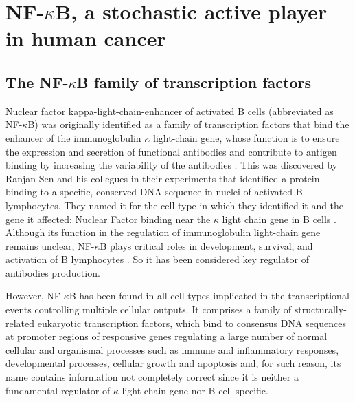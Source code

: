 \documentclass[12pt,a4paper]{report}
\begin{document}
\part{NF-\texorpdfstring{$\kappa$}{}B, a stochastic active player in human cancer}
\chapter{The NF-\texorpdfstring{$\kappa$}{}B family of transcription factors}



Nuclear factor kappa-light-chain-enhancer of activated B cells (abbreviated as NF-$\kappa$B) was originally identified as a family of transcription factors that bind the enhancer of the immunoglobulin $\kappa$ light-chain gene, whose function is to ensure the expression and secretion of functional antibodies and contribute to antigen binding by increasing the variability of the antibodies \cite{immunoglobulin}. This was discovered by Ranjan Sen and his collegues in their experiments that identified a protein binding to a specific, conserved DNA sequence in nuclei of activated B lymphocytes. They named it for the cell type in which they identified it and the gene it affected: Nuclear Factor binding near the $\kappa$ light chain gene in B cells \cite{nfkb30years}. Although its function in the regulation of immunoglobulin light-chain gene remains unclear, NF-$\kappa$B plays critical roles in development, survival, and activation of B lymphocytes \cite{Immuno}. So it has been considered key regulator of antibodies production. 

However, NF-$\kappa$B has been found in all cell types implicated in the transcriptional events controlling multiple cellular outputs. It comprises a family of structurally-related eukaryotic transcription factors, which bind to consensus DNA sequences at promoter regions of responsive genes regulating a large number of normal cellular and organismal processes such as immune and inflammatory responses, developmental processes, cellular growth and apoptosis and, for such reason, its name contains information not completely correct since it is neither a fundamental regulator of $\kappa$ light-chain gene nor B-cell specific.
\end{document}
